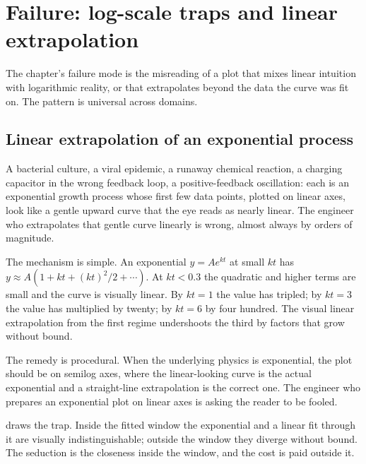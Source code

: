 \section{Failure: log-scale traps and linear extrapolation}

The chapter's failure mode is the misreading of a plot that mixes
linear intuition with logarithmic reality, or that extrapolates
beyond the data the curve was fit on. The pattern is universal across
domains.

\subsection{Linear extrapolation of an exponential process}

A bacterial culture, a viral epidemic, a runaway chemical reaction,
a charging capacitor in the wrong feedback loop, a positive-feedback
oscillation: each is an exponential growth process whose first few
data points, plotted on linear axes, look like a gentle upward curve
that the eye reads as nearly linear. The engineer who extrapolates
that gentle curve linearly is wrong, almost always by orders of
magnitude.

The mechanism is simple. An exponential $y = A e^{kt}$ at small $kt$
has $y \approx A(1 + kt + (kt)^{2}/2 + \cdots)$. At $kt < 0.3$ the
quadratic and higher terms are small and the curve is visually
linear. By $kt = 1$ the value has tripled; by $kt = 3$ the value has
multiplied by twenty; by $kt = 6$ by four hundred. The visual linear
extrapolation from the first regime undershoots the third by factors
that grow without bound.

The remedy is procedural. When the underlying physics is exponential,
the plot should be on semilog axes, where the linear-looking curve
is the actual exponential and a straight-line extrapolation is the
correct one. The engineer who prepares an exponential plot on linear
axes is asking the reader to be fooled.



 draws the trap. Inside the
fitted window the exponential and a linear fit through it are
visually indistinguishable; outside the window they diverge without
bound. The seduction is the closeness inside the window, and the cost
is paid outside it.

